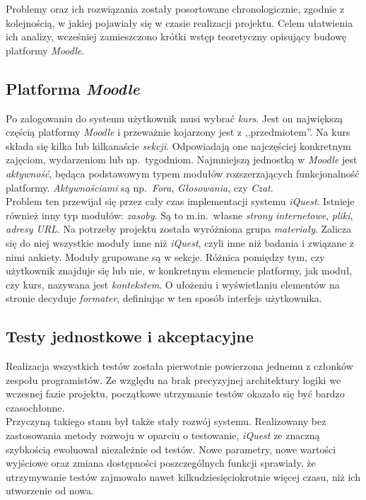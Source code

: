 Problemy oraz ich rozwiązania zostały posortowane chronologicznie, zgodnie z kolejnością, w jakiej pojawiały się w czasie realizacji projektu. Celem ułatwienia ich analizy, wcześniej zamieszczono krótki wstęp teoretyczny opisujący budowę platformy \textit{Moodle}.

\subsection{Platforma \textit{Moodle}}
\label{Chapter622}

Po zalogowaniu do systemu użytkownik musi wybrać \textit{kurs}. Jest on największą częścią platformy \textit{Moodle} i przeważnie kojarzony jest z ,,przedmiotem''. Na kurs składa się kilka lub kilkanaście \textit{sekcji}. Odpowiadają one najczęściej konkretnym zajęciom, wydarzeniom lub np.~tygodniom. Najmniejszą jednostką w \textit{Moodle} jest \textit{aktywność}, będąca podstawowym typem modułów rozszerzających funkcjonalność platformy. \textit{Aktywnościami} są np.~\textit{Fora}, \textit{Głosowania}, czy \textit{Czat}. \\
Problem ten przewijał się przez cały czas implementacji systemu \textit{iQuest}.
Istnieje również inny typ modułów: \textit{zasoby}. Są to m.in.~własne \textit{strony internetowe}, \textit{pliki}, \textit{adresy URL}. Na potrzeby projektu została wyróżniona grupa \textit{materiały}. Zalicza się do niej wszystkie moduły inne niż \textit{iQuest}, czyli inne niż badania i związane z nimi ankiety. Moduły grupowane są w sekcje. Różnica pomiędzy tym, czy użytkownik znajduje się lub nie, w konkretnym elemencie platformy, jak moduł, czy kurs, nazywana jest \textit{kontekstem}. O ułożeniu i wyświetlaniu elementów na stronie decyduje \textit{formater}, definiując w ten sposób interfejs użytkownika.




\subsection{Testy jednostkowe i akceptacyjne}
\label{Chapter62b}

Realizacja wszystkich testów została pierwotnie powierzona jednemu z członków zespołu programistów. Ze względu na brak precyzyjnej architektury logiki we wczesnej fazie projektu, początkowe utrzymanie testów okazało się być bardzo czasochłonne. \\

Przyczyną takiego stanu był także stały rozwój systemu. Realizowany bez zastosowania metody rozwoju w oparciu o testowanie, \textit{iQuest} ze znaczną szybkością ewoluował niezależnie od testów. Nowe parametry, nowe wartości wyjściowe oraz zmiana dostępności poszczególnych funkcji sprawiały, że utrzymywanie testów zajmowało nawet kilkudziesięciokrotnie więcej czasu, niż ich utworzenie od nowa. \\

